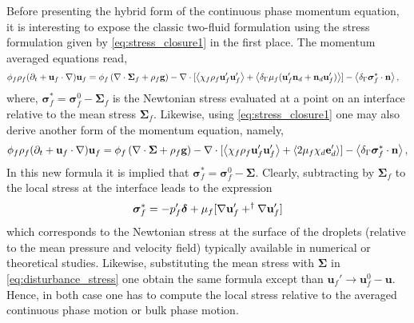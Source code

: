 Before presenting the hybrid form of the continuous phase momentum equation, it is interesting to expose the classic two-fluid formulation using the stress formulation given by \ref{eq:stress_closure1} in the first place. 
The momentum averaged equations read, 
\begin{align}
    \phi_f \rho_f(\pddt + \textbf{u}_f  \cdot \grad) \textbf{u}_f
    &= \phi_f 
    \left(\div \bm{\Sigma}_f
    + \rho_f \textbf{g}\right)
    - \div 
    [\avg{\chi_f\rho_f \textbf{u}_f'\textbf{u}_f'}
    +\avg{\delta_\Gamma \mu_f( \textbf{u}_f'  \textbf{n}_d +  \textbf{n}_d \textbf{u}_f')}]
    - \avg{\delta_\Gamma \bm\sigma_f^*\cdot \textbf{n}},
    \label{eq:two_fluid_momentum}
\end{align}
where, $\bm\sigma_f^*=\bm\sigma_f^0 - \bm\Sigma_f$ is the Newtonian stress evaluated at a point on an interface relative to the mean stress $\bm\Sigma_f$. 
Likewise, using \ref{eq:stress_closure1} one may also derive another form of the momentum equation, namely,
\begin{equation}
    \phi_f \rho_f(\pddt + \textbf{u}_f  \cdot \grad) \textbf{u}_f
    = \phi_f 
    \left(\div \bm{\Sigma}
    + \rho_f \textbf{g}\right)
    - \div 
    [\avg{\chi_f\rho_f \textbf{u}_f'\textbf{u}_f'} + \avg{2\mu_f \chi_d \textbf{e}_d'}]
    - \avg{\delta_\Gamma \bm\sigma_f^*\cdot \textbf{n}},
    \label{eq:two_fluid_momentum2}
\end{equation} 
In this new formula it is implied that $\bm\sigma_f^*=\bm\sigma_f^0 - \bm\Sigma$.
Clearly, subtracting by $\bm\Sigma_f$ to the local stress at the interface leads to the expression 
\begin{equation}
    \bm\sigma_f^* 
    =
    -p_f'\bm\delta
    + \mu_f [
        \grad \textbf{u}_f'
        + ^\dagger \grad \textbf{u}_f'
    ]
    \label{eq:disturbance_stress}
\end{equation}
which corresponds to the Newtonian stress at the surface of the droplets (relative to the mean pressure and velocity field) typically available in numerical or theoretical studies.
Likewise, substituting the mean stress with $\bm\Sigma$ in \ref{eq:disturbance_stress} one obtain the same formula except than $\textbf{u}_f'\to \textbf{u}_f^0 - \textbf{u}$. 
Hence, in both case one has to compute the local stress relative to the averaged continuous phase motion or bulk phase motion. 




